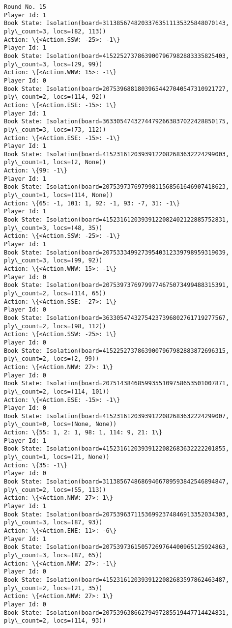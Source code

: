 \documentclass[11pt]{article}
\begin{document}
\begin{Verbatim}[commandchars=\\\{\}]
Round No. 15
Player Id: 1
Book State: Isolation(board=31138567482033763511135325848070143, ply\_count=3, locs=(82, 113))
Action: \{<Action.SSW: -25>: -1\}
Player Id: 1
Book State: Isolation(board=41522527378639007967982883335825403, ply\_count=3, locs=(29, 99))
Action: \{<Action.WNW: 15>: -1\}
Player Id: 0
Book State: Isolation(board=20753968818039654427040547310921727, ply\_count=2, locs=(114, 92))
Action: \{<Action.ESE: -15>: 1\}
Player Id: 1
Book State: Isolation(board=36330547432744792663837022428850175, ply\_count=3, locs=(73, 112))
Action: \{<Action.ESE: -15>: -1\}
Player Id: 1
Book State: Isolation(board=41523161203939122082683632224299003, ply\_count=1, locs=(2, None))
Action: \{99: -1\}
Player Id: 1
Book State: Isolation(board=20753973769799811568561646907418623, ply\_count=1, locs=(114, None))
Action: \{65: -1, 101: 1, 92: -1, 93: -7, 31: -1\}
Player Id: 1
Book State: Isolation(board=41523161203939122082402122885752831, ply\_count=3, locs=(48, 35))
Action: \{<Action.SSW: -25>: -1\}
Player Id: 1
Book State: Isolation(board=20753334992739540312339798959319039, ply\_count=3, locs=(99, 92))
Action: \{<Action.WNW: 15>: -1\}
Player Id: 0
Book State: Isolation(board=20753973769799774675073499488315391, ply\_count=2, locs=(114, 65))
Action: \{<Action.SSE: -27>: 1\}
Player Id: 0
Book State: Isolation(board=36330547432754237396802761719277567, ply\_count=2, locs=(98, 112))
Action: \{<Action.SSW: -25>: 1\}
Player Id: 0
Book State: Isolation(board=41522527378639007967982883872696315, ply\_count=2, locs=(2, 99))
Action: \{<Action.NNW: 27>: 1\}
Player Id: 0
Book State: Isolation(board=20751438468599355109758653501007871, ply\_count=2, locs=(114, 101))
Action: \{<Action.ESE: -15>: -1\}
Player Id: 0
Book State: Isolation(board=41523161203939122082683632224299007, ply\_count=0, locs=(None, None))
Action: \{55: 1, 2: 1, 98: 1, 114: 9, 21: 1\}
Player Id: 1
Book State: Isolation(board=41523161203939122082683632222201855, ply\_count=1, locs=(21, None))
Action: \{35: -1\}
Player Id: 0
Book State: Isolation(board=31138567486869466789593842546894847, ply\_count=2, locs=(55, 113))
Action: \{<Action.NNW: 27>: 1\}
Player Id: 1
Book State: Isolation(board=20753963711536992374846913352034303, ply\_count=3, locs=(87, 93))
Action: \{<Action.ENE: 11>: -6\}
Player Id: 1
Book State: Isolation(board=20753973615057269764400965125924863, ply\_count=3, locs=(87, 65))
Action: \{<Action.NNW: 27>: -1\}
Player Id: 0
Book State: Isolation(board=41523161203939122082683597862463487, ply\_count=2, locs=(21, 35))
Action: \{<Action.NNW: 27>: 1\}
Player Id: 0
Book State: Isolation(board=20753963866279497285519447714424831, ply\_count=2, locs=(114, 93))

\end{Verbatim}
\end{document}
